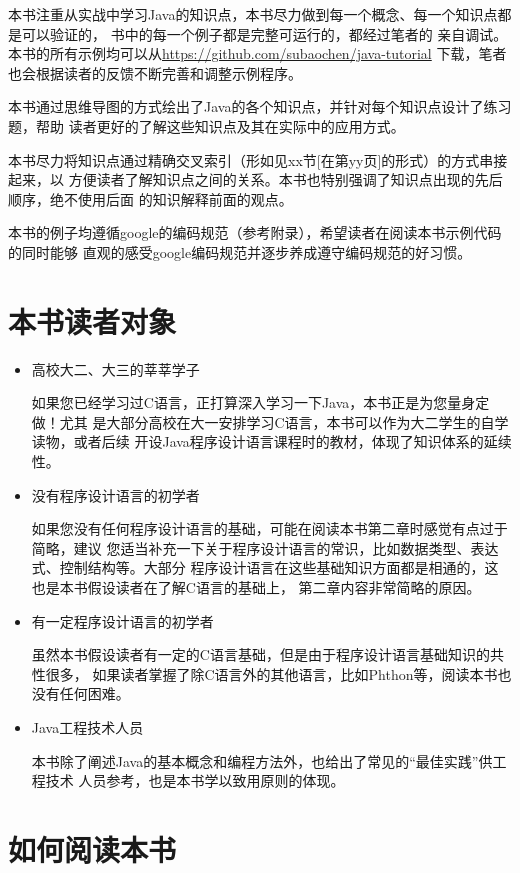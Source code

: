 本书注重从实战中学习Java的知识点，本书尽力做到每一个概念、每一个知识点都是可以验证的，
书中的每一个例子都是完整可运行的，都经过笔者的
亲自调试。本书的所有示例均可以从\url{https://github.com/subaochen/java-tutorial}
下载，笔者也会根据读者的反馈不断完善和调整示例程序。

本书通过思维导图的方式绘出了Java的各个知识点，并针对每个知识点设计了练习题，帮助
读者更好的了解这些知识点及其在实际中的应用方式。

本书尽力将知识点通过精确交叉索引（形如见xx节[在第yy页]的形式）的方式串接起来，以
方便读者了解知识点之间的关系。本书也特别强调了知识点出现的先后顺序，绝不使用后面
的知识解释前面的观点。

本书的例子均遵循google的编码规范（参考附录），希望读者在阅读本书示例代码的同时能够
直观的感受google编码规范并逐步养成遵守编码规范的好习惯。

\section*{本书读者对象}
\begin{itemize}
    \item 高校大二、大三的莘莘学子

        如果您已经学习过C语言，正打算深入学习一下Java，本书正是为您量身定做！尤其
        是大部分高校在大一安排学习C语言，本书可以作为大二学生的自学读物，或者后续
        开设Java程序设计语言课程时的教材，体现了知识体系的延续性。
    \item 没有程序设计语言的初学者
        
        如果您没有任何程序设计语言的基础，可能在阅读本书第二章时感觉有点过于简略，建议
        您适当补充一下关于程序设计语言的常识，比如数据类型、表达式、控制结构等。大部分
        程序设计语言在这些基础知识方面都是相通的，这也是本书假设读者在了解C语言的基础上，
        第二章内容非常简略的原因。
    \item 有一定程序设计语言的初学者
        
        虽然本书假设读者有一定的C语言基础，但是由于程序设计语言基础知识的共性很多，
        如果读者掌握了除C语言外的其他语言，比如Phthon等，阅读本书也没有任何困难。
    \item Java工程技术人员
        
        本书除了阐述Java的基本概念和编程方法外，也给出了常见的“最佳实践”供工程技术
        人员参考，也是本书学以致用原则的体现。
\end{itemize}

\section*{如何阅读本书}

